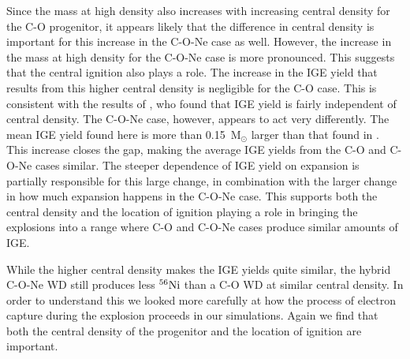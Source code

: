 \documentclass[iop,apj]{emulateapj}
\newcommand{\Ni}[1]{\ensuremath{{}^{#1}{\rm Ni}}}
\begin{document}
Since the mass at high density also increases with increasing central density for the C-O progenitor,
it appears likely that the difference in central density is important for this increase in the C-O-Ne case as well.
However, the increase in the mass at high density for the C-O-Ne case is more pronounced.
This suggests that the central ignition also plays a role.
The increase in the IGE yield that results from this higher central density is negligible for the C-O case.
This is consistent with the results of \citet{Kruegeretal2012}, who found that IGE yield is fairly independent of central density.
The C-O-Ne case, however, appears to act very differently.
The mean IGE yield found here is more than 0.15~M$_\odot$ larger than that found in \citet{willcoxetal2016}.
This increase closes the gap, making the average IGE yields from the C-O and C-O-Ne cases similar.
The steeper dependence of IGE yield on expansion is partially responsible for this large change, in combination with the larger change in how much expansion happens in the C-O-Ne case.
This supports both the central density and the location of ignition playing a role in bringing the explosions into a range where C-O and C-O-Ne cases produce similar amounts of IGE.

While the higher central density makes the IGE yields quite similar, the hybrid C-O-Ne WD still produces less \Ni{56} than a C-O WD at similar central density.
In order to understand this we looked more carefully at how the process of electron capture during the explosion proceeds in our simulations.
Again we find that both the central density of the progenitor and the location of ignition are important.
\end{document}
